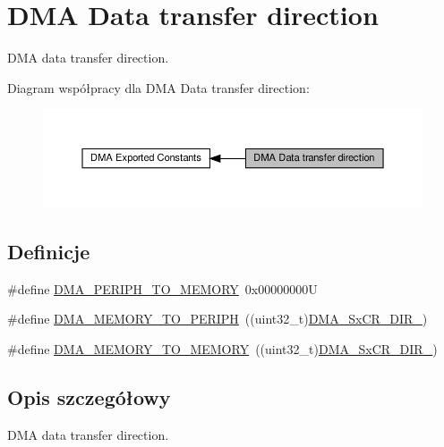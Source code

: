 \hypertarget{group___d_m_a___data__transfer__direction}{}\section{D\+MA Data transfer direction}
\label{group___d_m_a___data__transfer__direction}


D\+MA data transfer direction.  


Diagram współpracy dla D\+MA Data transfer direction\+:\nopagebreak
\begin{figure}[H]
\begin{center}
\leavevmode
\includegraphics[width=350pt]{group___d_m_a___data__transfer__direction}
\end{center}
\end{figure}
\subsection*{Definicje}
\begin{DoxyCompactItemize}
\item 
\#define \hyperlink{group___d_m_a___data__transfer__direction_gacb2cbf03ecae6804ae4a6f60a3e37c12}{D\+M\+A\+\_\+\+P\+E\+R\+I\+P\+H\+\_\+\+T\+O\+\_\+\+M\+E\+M\+O\+RY}~0x00000000U
\item 
\#define \hyperlink{group___d_m_a___data__transfer__direction_ga9e76fc559a2d5c766c969e6e921b1ee9}{D\+M\+A\+\_\+\+M\+E\+M\+O\+R\+Y\+\_\+\+T\+O\+\_\+\+P\+E\+R\+I\+PH}~((uint32\+\_\+t)\hyperlink{group___peripheral___registers___bits___definition_gadca9547536f3d2f76577275964b4875e}{D\+M\+A\+\_\+\+Sx\+C\+R\+\_\+\+D\+I\+R\+\_})
\item 
\#define \hyperlink{group___d_m_a___data__transfer__direction_ga0695035d725855ccf64d2d8452a33810}{D\+M\+A\+\_\+\+M\+E\+M\+O\+R\+Y\+\_\+\+T\+O\+\_\+\+M\+E\+M\+O\+RY}~((uint32\+\_\+t)\hyperlink{group___peripheral___registers___bits___definition_gac52c8d6ecad03bfe531867fa7457f2ae}{D\+M\+A\+\_\+\+Sx\+C\+R\+\_\+\+D\+I\+R\+\_})
\end{DoxyCompactItemize}


\subsection{Opis szczegółowy}
D\+MA data transfer direction. 



